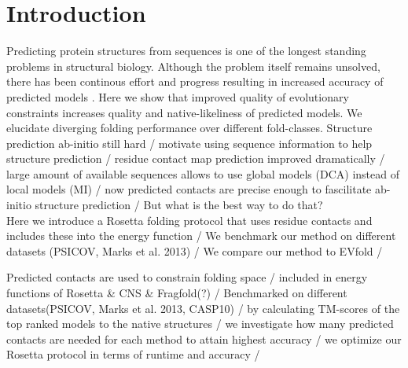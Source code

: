\documentclass{bioinfo}
\begin{document}
\section{Introduction}
Predicting protein structures from sequences is one of the longest standing problems in structural biology. Although the problem itself remains unsolved, there has been continous effort and progress resulting in increased accuracy of predicted models \cite{casp}. 
Here we show that improved quality of evolutionary constraints increases quality and native-likeliness of predicted models. We elucidate diverging folding performance over different fold-classes. 
Structure prediction ab-initio still hard / motivate using sequence information to help structure prediction / residue contact map prediction improved dramatically / large amount of available sequences allows to use global models (DCA) instead of local models (MI) / now predicted contacts are precise enough to fascilitate ab-initio structure prediction / But what is the best way to do that? \\ 
Here we introduce a Rosetta folding protocol that uses residue contacts and includes these into the energy function / We benchmark our method on different datasets (PSICOV, Marks et al. 2013) / We compare our method to EVfold / 

Predicted contacts are used to constrain folding space / included in energy functions of Rosetta \& CNS \& Fragfold(?) / Benchmarked on different datasets(PSICOV, Marks et al. 2013, CASP10) / by calculating TM-scores of the top ranked models to the native structures / we investigate how many predicted contacts are needed for each method to attain highest accuracy / we optimize our Rosetta protocol in terms of runtime and accuracy / 
\end{document}
